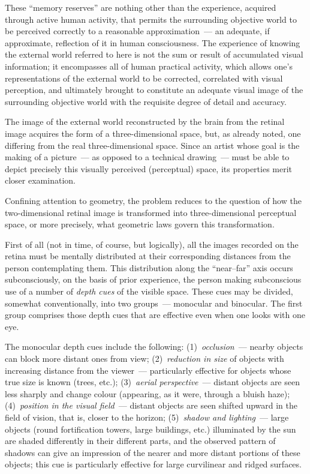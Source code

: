 These ``memory reserves'' are nothing other than the experience, acquired through
active human activity, that permits the surrounding objective world to be perceived
correctly to a reasonable approximation~--- an adequate, if approximate, reflection of
it in human consciousness.  The experience of knowing the external world referred to
here is not the sum or result of accumulated visual information; it encompasses all
of human practical activity, which allows one's representations of the external world
to be corrected, correlated with visual perception, and ultimately brought to constitute
an adequate visual image of the surrounding objective world with the requisite degree
of detail and accuracy.


The image of the external world reconstructed by the brain from the retinal image
acquires the form of a three-dimensional space, but, as already noted, one differing
from the real three-dimensional space.  Since an artist whose goal is the making of a
picture~--- as opposed to a technical drawing~--- must be able to depict precisely this
visually perceived (perceptual) space, its properties merit closer examination.

Confining attention to geometry, the problem reduces to the question of how the
two-dimensional retinal image is transformed into three-dimensional perceptual space,
or more precisely, what geometric laws govern this transformation.

First of all (not in time, of course, but logically), all the images recorded on the retina
must be mentally distributed at their corresponding distances from the person
contemplating them.  This distribution along the ``near--far'' axis occurs subconsciously,
on the basis of prior experience, the person making subconscious use of a number of
\emph{depth cues} of the visible space.  These cues may be divided, somewhat
conventionally, into two groups~--- monocular and binocular.  The first group comprises
those depth cues that are effective even when one looks with one eye.

The monocular depth cues include the following:
(1)~\emph{occlusion}~--- nearby objects can block more distant ones from view;
(2)~\emph{reduction in size} of objects with increasing distance from the viewer~---
particularly effective for objects whose true size is known (trees, etc.);
(3)~\emph{aerial perspective}~--- distant objects are seen less sharply and change
colour (appearing, as it were, through a bluish haze);
(4)~\emph{position in the visual field}~--- distant objects are seen shifted upward in the
field of vision, that is, closer to the horizon;
(5)~\emph{shadow and lighting}~--- large objects (round fortification towers, large
buildings, etc.) illuminated by the sun are shaded differently in their different parts,
and the observed pattern of shadows can give an impression of the nearer and more
distant portions of these objects; this cue is particularly effective for large curvilinear
and ridged surfaces.

